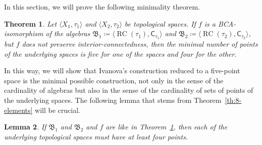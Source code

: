 \documentclass[a4paper,12pt]{amsart}
\numberwithin{equation}{section}
\newtheorem{theorem}{Theorem}[section]
\newtheorem{lemma}[theorem]{Lemma}
\theoremstyle{mytheoremstyle}
\DeclareMathOperator{\RCvtex}{RC}
\begin{document}
In this section, we will prove the following minimality theorem.
%
\begin{theorem}%
\label{th:minimality-theorem}
Let $  \langle X_{1},\tau _{1}  \rangle $ and
$  \langle X_{2},\tau _{2}  \rangle $ be topological spaces. If
$f$ is a BCA-isomorphism of the algebras
$\mathfrak{B}_{1}\coloneqq   \langle \RCvtex (\tau _{1}),\mathord{
\mathrel{\mathsf{C}}_{\tau _{1}}}  \rangle $ and
$\mathfrak{B}_{2}\coloneqq   \langle \RCvtex (\tau _{2}),\mathord{
\mathrel{\mathsf{C}}_{\tau _{2}}}  \rangle $, but $f$ does not preserve
interior-connectedness, then the minimal number of points of the underlying
spaces is five for one of the spaces and four for the other.
\end{theorem}
%
 In this way, we will show that Ivanova's construction reduced to a five-point
space is the minimal possible construction, not only in the sense of the
cardinality of algebras but also in the sense of the cardinality of sets
of points of the underlying spaces. The following lemma that stems from
Theorem~\ref{th:8-elements} will be crucial.
%
\begin{lemma}%
\label{lem:4-points}
If $\mathfrak{B}_{1}$ and $\mathfrak{B}_{2}$ and $f$ are like in Theorem~\ref{th:minimality-theorem},
then each of the underlying topological spaces must have at least four
points.
\end{lemma}
%
\end{document}
